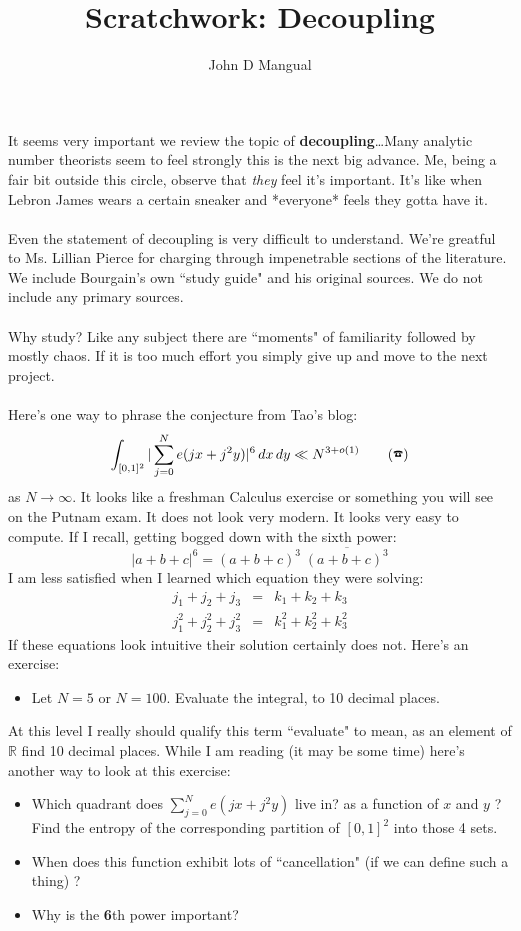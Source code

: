 \documentclass[12pt]{article}
\title{Scratchwork: Decoupling}
\author{John D Mangual}
\date{}
\begin{document}
\selectfont \fontsize{12.5}{15}\selectfont

\maketitle

\noindent It seems very important we review the topic of \textbf{decoupling}\dots Many analytic number theorists seem to feel strongly this is the next big advance.  Me, being a fair bit outside this circle, observe that \textit{they} feel it's important.  It's like when Lebron James wears a certain sneaker and *everyone* feels they gotta have it. \\ \\
Even the statement of decoupling is very difficult to understand. We're greatful to Ms. Lillian Pierce for charging through impenetrable sections of the literature.  We include Bourgain's own ``study guide" and his original sources.  We do not include any primary sources. \\ \\
Why study?  Like any subject there are ``moments" of familiarity followed by mostly chaos.  If it is too much effort you simply give up and move to the next project. \\ \\
Here's one way to phrase the conjecture from Tao's blog:
\[ \int_{[0,1]^2}  | \sum_{j= 0}^N e(jx + j^2 y) |^6 \, dx \, dy \ll N^{3 + o(1)} \tag{\ding{37}}\]
as $N \to \infty$. It looks like a freshman Calculus exercise or something you will see on the Putnam exam.  It does not look very modern.   It looks very easy to compute.  If I recall, getting bogged down with the sixth power:
$$  | a + b + c|^6 = (a + b + c)^3 \; \overline{(a+b+c)^3}$$
I am less satisfied when I learned which equation they were solving:
\begin{eqnarray*}
j_1 + j_2 + j_3 &=& k_1 + k_2 + k_3 \\
j_1^2 + j_2^2 + j_3^2 &=& k_1^2 + k_2^2 + k_3^2 
\end{eqnarray*}
If these equations look intuitive their solution certainly does not.  Here's an exercise:
\begin{itemize}
	\item Let $N = 5$ or $N = 100$.  Evaluate the integral,  to 10 decimal places.
\end{itemize}
At this level I really should qualify this term ``evaluate" to mean, as an element of $\mathbb{R}$ find 10 decimal places.  While I am reading (it may be some time) here's another way to look at this exercise:
\begin{itemize}
\item Which quadrant does $\sum_{j= 0}^N e(jx + j^2 y) $ live in? as a function of $x$ and $y$ ?  Find the entropy of the corresponding partition of $[0,1]^2$ into those 4 sets.
\item When does this function exhibit lots of ``cancellation" (if we can define such a thing) ?
\item Why is the {\color{red!50!white}\textbf{6}}th power important?
\end{itemize}
\end{document}
